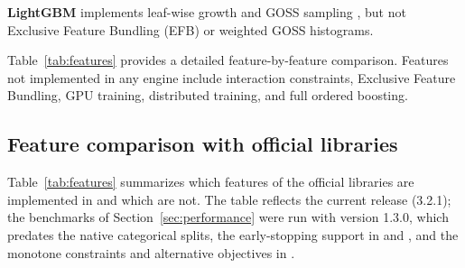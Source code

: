 \documentclass[article]{jss}
\begin{document}
\textbf{LightGBM} implements leaf-wise growth and GOSS sampling
\citep{Ke+Meng+Finley:2017}, but not Exclusive Feature Bundling (EFB) or
weighted GOSS histograms.

Table~\ref{tab:features} provides a detailed feature-by-feature comparison.
Features not implemented in any engine include interaction constraints,
Exclusive Feature Bundling, GPU training, distributed training, and full
ordered boosting.

\subsection{Feature comparison with official libraries} \label{sec:feature_compare}

Table~\ref{tab:features} summarizes which features of the official libraries
are implemented in  and which are not. The table reflects the
current release (3.2.1); the benchmarks of Section~\ref{sec:performance} were
run with version 1.3.0, which predates the native categorical splits, the
early-stopping support in  and , and the monotone
constraints and alternative objectives in .
\end{document}
